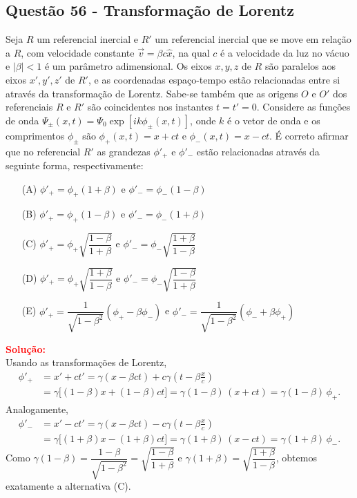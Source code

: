 \documentclass[a4paper,12pt]{article}
\begin{document}
\begin{flushleft}
\subsection{Quest\~ao 56 - Transformação de Lorentz}

Seja \(R\) um referencial inercial e \(R'\) um referencial inercial que se move em relação a \(R\), com velocidade constante \(\vec{v} = \beta c \hat{x}\), 
na qual \(c\) é a velocidade da luz no vácuo e \(|\beta| < 1\) é um parâmetro adimensional. Os eixos \(x, y, z\) de \(R\) são paralelos aos 
eixos \(x', y', z'\) de \(R'\), e as coordenadas espaço-tempo estão relacionadas entre si através da transformação de Lorentz. Sabe-se também que 
as origens \(O\) e \(O'\) dos referenciais \(R\) e \(R'\) são coincidentes nos instantes \(t = t' = 0\). Considere as funções de onda 
\(\Psi_\pm(x,t) = \Psi_0 \exp[ik\phi_\pm(x,t)]\), onde \(k\) é o vetor de onda e os comprimentos \(\phi_\pm\) são \(\phi_+(x,t) = x + ct\) e 
\(\phi_-(x,t) = x - ct\). É correto afirmar que no referencial \(R'\) as grandezas \(\phi'_+\) e \(\phi'_-\) estão relacionadas através da seguinte 
forma, respectivamente:

\begin{itemize}
\item[(A)] \(\phi'_+ = \phi_+(1+\beta)\) \quad e \quad \(\phi'_- = \phi_-(1-\beta)\)
\item[(B)] \(\phi'_+ = \phi_+(1-\beta)\) \quad e \quad \(\phi'_- = \phi_-(1+\beta)\)
\item[(C)] \(\phi'_+ = \phi_+\sqrt{\dfrac{1-\beta}{1+\beta}}\) \quad e \quad \(\phi'_- = \phi_-\sqrt{\dfrac{1+\beta}{1-\beta}}\)
\item[(D)] \(\phi'_+ = \phi_+\sqrt{\dfrac{1+\beta}{1-\beta}}\) \quad e \quad \(\phi'_- = \phi_-\sqrt{\dfrac{1-\beta}{1+\beta}}\)
\item[(E)] \(\phi'_+ = \dfrac{1}{\sqrt{1-\beta^2}}(\phi_+ - \beta\phi_-)\) \quad e \quad \(\phi'_- = \dfrac{1}{\sqrt{1-\beta^2}}(\phi_- + \beta\phi_+)\)
\end{itemize}

\vspace{0.5cm}

\textcolor{red}{\textbf{Solução:}}\\

Usando as transformações de Lorentz,
\[
\begin{aligned}
\phi'_+ &= x' + c t' = \gamma(x-\beta ct) + c\gamma\left(t-\beta\frac{x}{c}\right) \\
&= \gamma\big[(1-\beta)x + (1-\beta)ct\big] = \gamma(1-\beta)\,(x+ct)=\gamma(1-\beta)\,\phi_+.
\end{aligned}
\]
Analogamente,
\[
\begin{aligned}
\phi'_- &= x' - c t' = \gamma(x-\beta ct) - c\gamma\left(t-\beta\frac{x}{c}\right) \\
&= \gamma\big[(1+\beta)x - (1+\beta)ct\big] = \gamma(1+\beta)\,(x-ct)=\gamma(1+\beta)\,\phi_-.
\end{aligned}
\]
Como \(\gamma(1-\beta)=\dfrac{1-\beta}{\sqrt{1-\beta^2}}=\sqrt{\dfrac{1-\beta}{1+\beta}}\) e \(\gamma(1+\beta)=\sqrt{\dfrac{1+\beta}{1-\beta}}\), obtemos exatamente a alternativa (C).


\end{flushleft}
\end{document}
